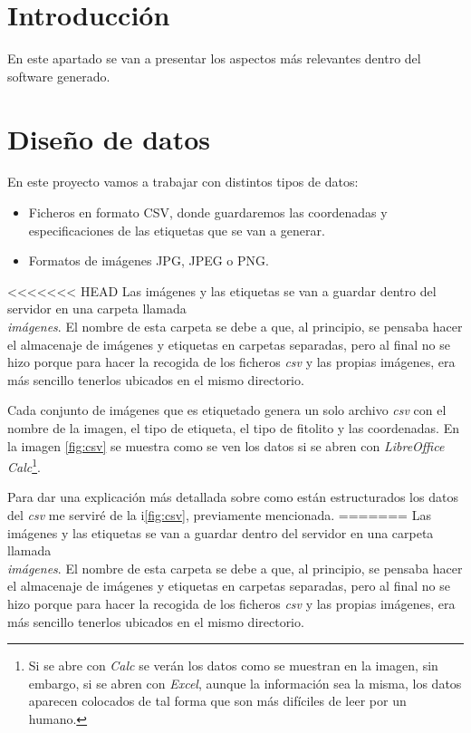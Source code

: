 
\section{Introducción}
En este apartado se van a presentar los aspectos más relevantes dentro del software generado.

\section{Diseño de datos}
En este proyecto vamos a trabajar con distintos tipos de datos:
\begin{itemize}
	\item Ficheros en formato CSV, donde guardaremos las coordenadas y especificaciones de las etiquetas que se van a generar.
	\item Formatos de imágenes JPG, JPEG o PNG.
\end{itemize}

<<<<<<< HEAD
Las imágenes y las etiquetas se van a guardar dentro del servidor en una carpeta llamada \textit{\\imágenes}. El nombre de esta carpeta se debe a que, al principio, se pensaba hacer el almacenaje de imágenes y etiquetas en carpetas separadas, pero al final no se hizo porque para hacer la recogida de los ficheros \textit{csv} y las propias imágenes, era más sencillo tenerlos ubicados en el mismo directorio.

Cada conjunto de imágenes que es etiquetado genera un solo archivo \textit{csv} con el nombre de la imagen, el tipo de etiqueta, el tipo de fitolito y las coordenadas. En la imagen \ref{fig:csv} se muestra como se ven los datos si se abren con \textit{LibreOffice Calc}\footnote{Si se abre con \textit{Calc} se verán los datos como se muestran en la imagen, sin embargo, si se abren con \textit{Excel}, aunque la información sea la misma, los datos aparecen colocados de tal forma que son más difíciles de leer por un humano.}.

Para dar una explicación más detallada sobre como están estructurados los datos del \textit{csv} me serviré de la i\ref{fig:csv}, previamente mencionada.
=======
Las imágenes y las etiquetas se van a guardar dentro del servidor en una carpeta llamada\textit{\\imágenes}. El nombre de esta carpeta se debe a que, al principio, se pensaba hacer el almacenaje de imágenes y etiquetas en carpetas separadas, pero al final no se hizo porque para hacer la recogida de los ficheros \textit{csv} y las propias imágenes, era más sencillo tenerlos ubicados en el mismo directorio.

